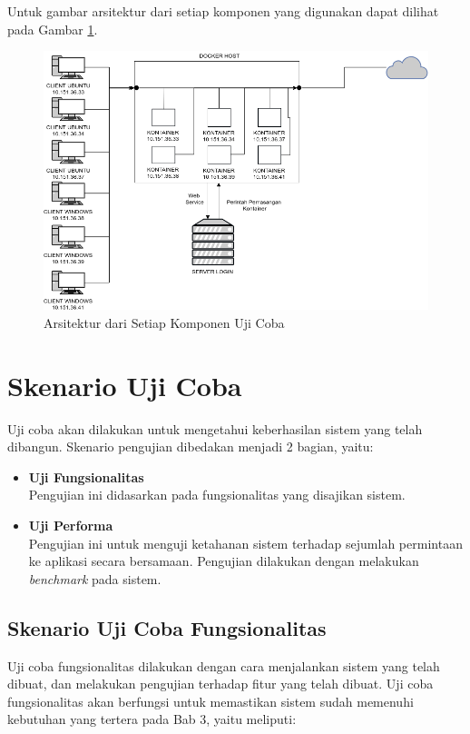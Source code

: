 			Untuk gambar arsitektur dari setiap komponen yang digunakan dapat dilihat pada Gambar \ref{arsitekturbab5}.
			
			\begin{figure}[H]
				\centering
				\includegraphics[width=\linewidth]{images/bab5/arsitekturbab5}
				\caption{Arsitektur dari Setiap Komponen Uji Coba}
				\label{arsitekturbab5}
			\end{figure}
			
   
\section{Skenario Uji Coba} \label{skenarioujicoba}
	Uji coba akan dilakukan untuk mengetahui keberhasilan sistem yang telah dibangun. Skenario pengujian dibedakan menjadi 2 bagian, yaitu:
    \begin{itemize}
    \item \textbf{Uji Fungsionalitas} \\
    	Pengujian ini didasarkan pada fungsionalitas yang disajikan sistem.
    \item \textbf{Uji Performa} \\
    	Pengujian ini untuk menguji ketahanan sistem terhadap sejumlah permintaan ke aplikasi secara bersamaan. Pengujian dilakukan dengan melakukan \textit{benchmark} pada sistem.
    \end{itemize}
    
\subsection{Skenario Uji Coba Fungsionalitas}
Uji coba fungsionalitas dilakukan dengan cara menjalankan sistem yang telah dibuat, dan melakukan pengujian terhadap fitur yang telah dibuat. Uji coba fungsionalitas akan berfungsi untuk memastikan sistem sudah memenuhi kebutuhan yang tertera pada Bab 3, yaitu meliputi:

